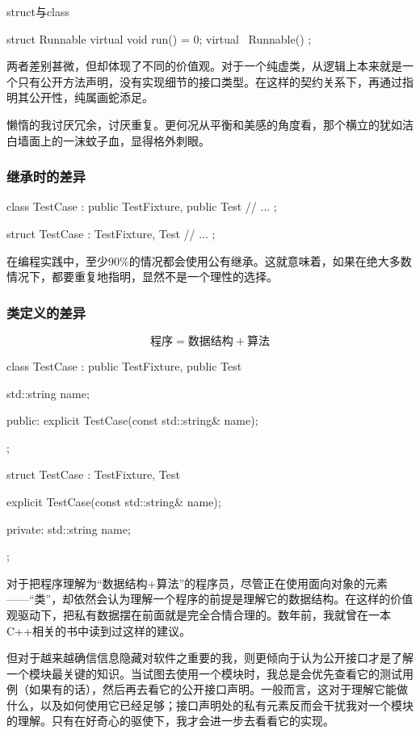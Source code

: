 \begin{content}
\begin{episode}{struct与class}
\begin{content}
\begin{c++}
struct Runnable {
  virtual void run() = 0;
  virtual ~Runnable() {}
};
\end{c++}

两者差别甚微，但却体现了不同的价值观。对于一个纯虚类，从逻辑上本来就是一个只有公开方法声明，没有实现细节的接口类型。在这样的契约关系下，再通过指明其公开性，纯属画蛇添足。

懒惰的我讨厌冗余，讨厌重复。更何况从平衡和美感的角度看，那个横立的犹如洁白墙面上的一沫蚊子血，显得格外刺眼。

\subsubsection{继承时的差异}

\begin{c++}
class TestCase : public TestFixture, public Test {
  // ...
};

struct TestCase : TestFixture, Test {
  // ...  
};
\end{c++}

在编程实践中，至少$90\%$的情况都会使用公有继承。这就意味着，如果在绝大多数情况下，都要重复地指明，显然不是一个理性的选择。

\subsubsection{类定义的差异}

\[\text{程序} = \text{数据结构} + \text{算法}\]

\begin{c++}
class TestCase : public TestFixture, public Test {
  std::string name;

public:
  explicit TestCase(const std::string& name);
};

struct TestCase : TestFixture, Test {
  explicit TestCase(const std::string& name);

private:
  std::string name;
};
\end{c++}

对于把程序理解为“数据结构+算法”的程序员，尽管正在使用面向对象的元素——“类”，却依然会认为理解一个程序的前提是理解它的数据结构。在这样的价值观驱动下，把私有数据摆在前面就是完全合情合理的。数年前，我就曾在一本C++相关的书中读到过这样的建议。

但对于越来越确信信息隐藏对软件之重要的我，则更倾向于认为公开接口才是了解一个模块最关键的知识。当试图去使用一个模块时，我总是会优先查看它的测试用例（如果有的话），然后再去看它的公开接口声明。一般而言，这对于理解它能做什么，以及如何使用它已经足够；接口声明处的私有元素反而会干扰我对一个模块的理解。只有在好奇心的驱使下，我才会进一步去看看它的实现。


\end{content}
\end{episode}
\end{content}
